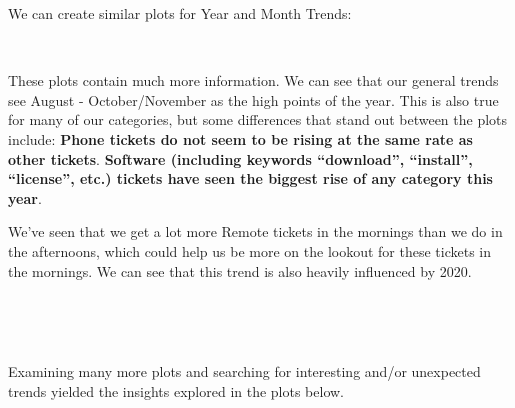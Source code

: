 \documentclass[11pt]{article}
\begin{document}
    We can create similar plots for Year and Month Trends:

\newpage

    \begin{center}

    \end{center}
    { \hspace*{\fill} \\}
    
    These plots contain much more information. We can see that our general
trends see August - October/November as the high points of the year.
This is also true for many of our categories, but some differences that
stand out between the plots include:  \textbf{Phone tickets do not seem to be rising at the
same rate as other tickets}. \textbf{Software (including keywords
``download'', ``install'', ``license'', etc.) tickets have seen the
biggest rise of any category this year}.

    
    We've seen that we get a lot more Remote tickets in the mornings than we do in the
afternoons, which could help us be more on the lookout for these tickets
in the mornings. We can see that this trend is also heavily influenced
by 2020.

    \begin{center}
    \end{center}
    { \hspace*{\fill} \\}

    \begin{center}
    \end{center}
    { \hspace*{\fill} \\}
    
Examining many more plots and searching for interesting and/or unexpected
trends yielded the insights explored in the plots below.

    \begin{center}
    \end{center}
    { \hspace*{\fill} \\}
    
\end{document}
